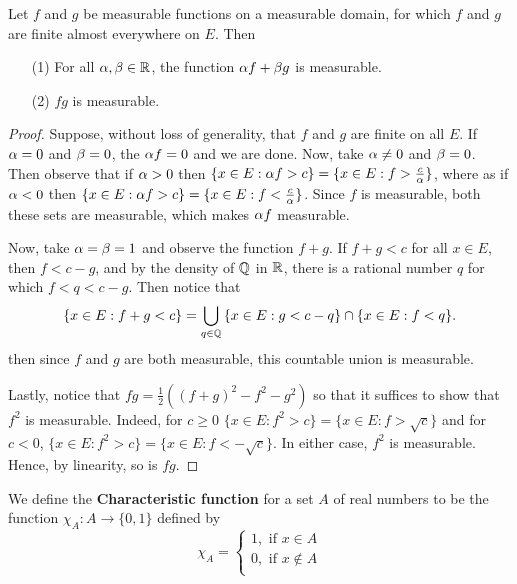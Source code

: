 \begin{theorem}\label{3.1.5}
    Let $f$ and  $g$ be measurable functions on a measurable domain, for which
    $f$ and  $g$ are finite almost everywhere on  $E$. Then
    \begin{enumerate}
        \item[(1)] For all $\alpha,\beta \in \mathbb{R}$, the function $\alpha f+\beta g$ is
            measurable.

        \item[(2)] $fg$ is measurable.
    \end{enumerate}
\end{theorem}
\begin{proof}
    Suppose, without loss of generality, that $f$ and  $g$ are finite on all
    $E$. If  $\alpha=0$ and  $\beta=0$, the  $\alpha f=0$ and we are done. Now, take
    $\alpha \neq 0$ and  $\beta=0$. Then observe that if  $\alpha>0$ then  $\{x \in E :
    \alpha f>c\}=\{x \in E : f>\frac{c}{\alpha}\}$, where as if $\alpha<0$ then  $\{x \in
    E : \alpha f>c\}=\{x \in E : f<\frac{c}{\alpha}\}$. Since $f$ is measurable, both
    these sets are measurable, which makes  $\alpha f$ measurable.

    Now, take  $\alpha=\beta=1$ and observe the function  $f+g$. If  $f+g<c$ for all
     $x \in E$, then  $f<c-g$, and by the density of  $\mathbb{Q}$ in  $\mathbb{R}$,  there is a
     rational number $q$ for which  $f<q<c-g$. Then notice that
     \begin{equation*}
         \{x \in E : f+g<c\}=\bigcup_{q \in \mathbb{Q}}{\{x \in E : g<c-q\} \cap \{x \in
         E : f<q\}}.
     \end{equation*}
     then since $f$ and  $g$ are both measurable, this countable union is
     measurable.

     Lastly, notice that  $fg=\frac{1}{2}((f+g)^2-f^2-g^2)$ so that it suffices
     to show that $f^2$ is measurable. Indeed, for  $c \geq 0$  $\{x \in E :
     f^2>c\}=\{x \in E : f>\sqrt{c}\}$ and for $c<0$,  $\{x \in E : f^2>c\}=\{x
     \in E : f<-\sqrt{c}\}$. In either case, $f^2$ is measurable. Hence, by
     linearity, so is  $fg$.
\end{proof}

\begin{definition}
    We define the \textbf{Characteristic function} for a set $A$ of real numbers
    to be the function $\chi_A:A \xrightarrow{} \{0,1\}$ defined by
    \begin{equation*}
        \chi_A=\begin{cases}
                1, \text{ if } x \in A  \\
                0, \text{ if } x \notin A   \\
            \end{cases}
    \end{equation*}
\end{definition}

